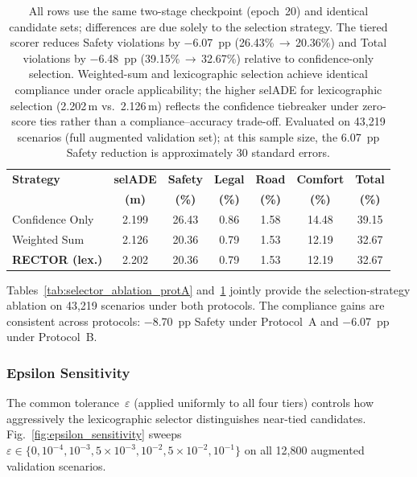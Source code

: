 \begin{table}[t]
\centering
\caption{Selector Ablation under Protocol~B (Full-28, Oracle, 43{,}219 Scenarios, Current Checkpoint)}
\label{tab:selector_ablation_protB}
\setlength{\tabcolsep}{3pt}
\begin{tabular}{lcccccc}
\toprule
\textbf{Strategy} & \textbf{selADE} & \textbf{Safety} & \textbf{Legal} & \textbf{Road} & \textbf{Comfort} & \textbf{Total} \\
 & \textbf{(m)} & \textbf{(\%)} & \textbf{(\%)} & \textbf{(\%)} & \textbf{(\%)} & \textbf{(\%)} \\
\midrule
Confidence Only & 2.199 & 26.43 & 0.86 & 1.58 & 14.48 & 39.15 \\
Weighted Sum & 2.126 & 20.36 & 0.79 & 1.53 & 12.19 & 32.67 \\
\textbf{RECTOR (lex.)} & 2.202 & 20.36 & 0.79 & 1.53 & 12.19 & 32.67 \\
\bottomrule
\end{tabular}
\vspace{1mm}
\caption*{\footnotesize All rows use the same two-stage checkpoint (epoch~20) and identical candidate sets; differences are due solely to the selection strategy.  The tiered scorer reduces Safety violations by $-$6.07~pp (26.43\%\,$\to$\,20.36\%) and Total violations by $-$6.48~pp (39.15\%\,$\to$\,32.67\%) relative to confidence-only selection.  Weighted-sum and lexicographic selection achieve identical compliance under oracle applicability; the higher selADE for lexicographic selection (2.202\,m vs.\ 2.126\,m) reflects the confidence tiebreaker under zero-score ties rather than a compliance--accuracy trade-off.  Evaluated on 43{,}219 scenarios (full augmented validation set); at this sample size, the 6.07~pp Safety reduction is approximately 30 standard errors.}
\end{table}

Tables~\ref{tab:selector_ablation_protA} and~\ref{tab:selector_ablation_protB} jointly provide the selection-strategy ablation on 43{,}219 scenarios under both protocols.  The compliance gains are consistent across protocols: $-$8.70~pp Safety under Protocol~A and $-$6.07~pp under Protocol~B.

\subsubsection{Epsilon Sensitivity}
\label{subsubsec:epsilon_sensitivity}

The common tolerance~$\varepsilon$ (applied uniformly to all four tiers) controls how aggressively the lexicographic selector distinguishes near-tied candidates. Fig.~\ref{fig:epsilon_sensitivity} sweeps $\varepsilon \in \{0, 10^{-4}, 10^{-3}, 5{\times}10^{-3}, 10^{-2}, 5{\times}10^{-2}, 10^{-1}\}$ on all 12{,}800 augmented validation scenarios.

